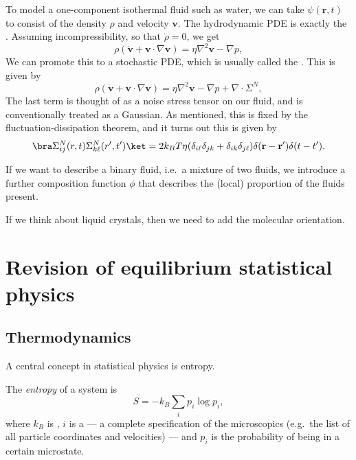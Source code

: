 \documentclass[a4paper]{article}
\begin{document}
\begin{eg}
  To model a one-component isothermal fluid such as water, we can take $\psi(\mathbf{r}, t)$ to consist of the density $\rho$ and velocity $\mathbf{v}$. The hydrodynamic PDE is exactly the . Assuming incompressibility, so that $\dot{\rho} = 0$, we get
  \[
    \rho (\dot{\mathbf{v}} + \mathbf{v} \cdot \nabla \mathbf{v}) = \eta \nabla^2 \mathbf{v} - \nabla p,
  \]
  We can promote this to a stochastic PDE, which is usually called the . This is given by
  \[
    \rho (\dot{\mathbf{v}} + \mathbf{v} \cdot \nabla \mathbf{v}) = \eta \nabla^2 \mathbf{v} - \nabla p + \nabla \cdot \Sigma^N,
  \]
  The last term is thought of as a noise stress tensor on our fluid, and is conventionally treated as a Gaussian. As mentioned, this is fixed by the fluctuation-dissipation theorem, and it turns out this is given by
  \[
    \bra \Sigma_{ij}^N(r, t) \Sigma_{k \ell}^N (r', t')\ket = 2k_B T \eta (\delta_{i\ell} \delta_{jk} + \delta_{ik} \delta_{j\ell}) \delta(\mathbf{r} - \mathbf{r}') \delta(t - t').
  \]
\end{eg}

\begin{eg}
  If we want to describe a binary fluid, i.e.\ a mixture of two fluids, we introduce a further composition function $\phi$ that describes the (local) proportion of the fluids present.

  If we think about liquid crystals, then we need to add the molecular orientation.
\end{eg}

\section{Revision of equilibrium statistical physics}
\subsection{Thermodynamics}
A central concept in statistical physics is entropy.

\begin{defi}[Entropy]
  The \emph{entropy} of a system is
  \[
    S = - k_B \sum_i p_i \log p_i,
  \]
  where $k_B$ is , $i$ is a  --- a complete specification of the microscopics (e.g.\ the list of all particle coordinates and velocities) --- and $p_i$ is the probability of being in a certain microstate.
\end{defi}
\end{document}
